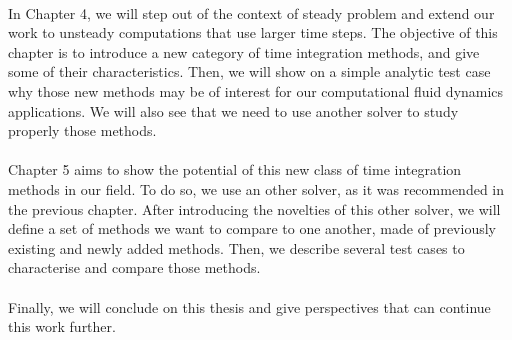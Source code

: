     \paragraph{}
    In Chapter 4, we will step out of the context of steady problem and extend our work to unsteady computations that use larger time steps.
    The objective of this chapter is to introduce a new category of time integration methods, and give some of their characteristics.
    Then, we will show on a simple analytic test case why those new methods may be of interest for our computational fluid dynamics applications.
    We will also see that we need to use another solver to study properly those methods.

    \paragraph{}
    Chapter 5 aims to show the potential of this new class of time integration methods in our field.
    To do so, we use an other solver, as it was recommended in the previous chapter.
    After introducing the novelties of this other solver, we will define a set of methods we want to compare to one another, made of previously existing and newly added methods.
    Then, we describe several test cases to characterise and compare those methods.

    \paragraph{}
    Finally, we will conclude on this thesis and give perspectives that can continue this work further.

